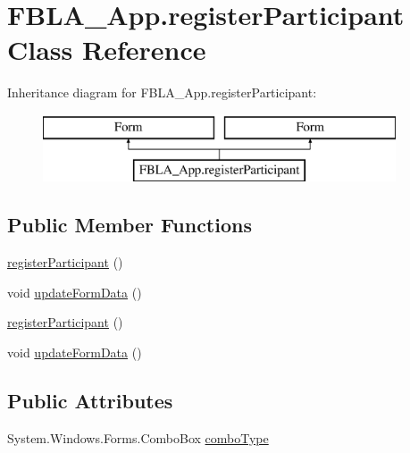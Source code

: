 \hypertarget{class_f_b_l_a___app_1_1register_participant}{\section{F\+B\+L\+A\+\_\+\+App.\+register\+Participant Class Reference}
\label{class_f_b_l_a___app_1_1register_participant}
}
Inheritance diagram for F\+B\+L\+A\+\_\+\+App.\+register\+Participant\+:\begin{figure}[H]
\begin{center}
\leavevmode
\includegraphics[height=2.000000cm]{class_f_b_l_a___app_1_1register_participant}
\end{center}
\end{figure}
\subsection*{Public Member Functions}
\begin{DoxyCompactItemize}
\item 
\hyperlink{class_f_b_l_a___app_1_1register_participant_a467ebfdda76db8feff44eaba30841c56}{register\+Participant} ()
\item 
void \hyperlink{class_f_b_l_a___app_1_1register_participant_aca82c150af15713e860b71c695d30214}{update\+Form\+Data} ()
\item 
\hyperlink{class_f_b_l_a___app_1_1register_participant_a467ebfdda76db8feff44eaba30841c56}{register\+Participant} ()
\item 
void \hyperlink{class_f_b_l_a___app_1_1register_participant_aca82c150af15713e860b71c695d30214}{update\+Form\+Data} ()
\end{DoxyCompactItemize}
\subsection*{Public Attributes}
\begin{DoxyCompactItemize}
\item 
System.\+Windows.\+Forms.\+Combo\+Box \hyperlink{class_f_b_l_a___app_1_1register_participant_acc44edd84913d8ac5f2cc8f0542607e8}{combo\+Type}
\end{DoxyCompactItemize}

